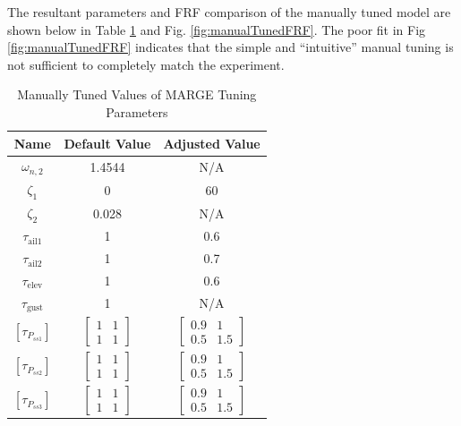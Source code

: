 The resultant parameters and FRF comparison of the manually tuned model are shown below in Table \ref{tab:manualTuning} and Fig. \ref{fig:manualTunedFRF}. The poor fit in Fig \ref{fig:manualTunedFRF} indicates that the simple and ``intuitive'' manual tuning is not sufficient to completely match the experiment.
\begin{table}[h]
	\centering
	\label{tab:manualTuning}
	\caption{Manually Tuned Values of MARGE Tuning Parameters}
	\begin{tabular}{ccc}
		\hline\hline
		Name & Default Value & Adjusted Value \\
		\hline
		$\omega_{n,2}$ & 1.4544 & N/A \\
		$\zeta_1$ & 0 & 60 \\
		$\zeta_2$ & 0.028 & N/A \\
		$\tau_\text{ail1}$ & 1 & 0.6 \\
		$\tau_\text{ail2}$ & 1 & 0.7 \\
		$\tau_\text{elev}$ & 1 & 0.6 \\
		$\tau_\text{gust}$ & 1 & N/A \\
		$\left[\tau_{P_{ss1}}\right]$ & $\begin{bmatrix} 1 & 1 \\ 1 & 1 \end{bmatrix}$ & $\begin{bmatrix} 0.9 & 1 \\ 0.5 & 1.5 \end{bmatrix}$ \\
		$\left[\tau_{P_{ss2}}\right]$ & $\begin{bmatrix} 1 & 1 \\ 1 & 1 \end{bmatrix}$ & $\begin{bmatrix} 0.9 & 1 \\ 0.5 & 1.5 \end{bmatrix}$ \\
		$\left[\tau_{P_{ss3}}\right]$ & $\begin{bmatrix} 1 & 1 \\ 1 & 1 \end{bmatrix}$ & $\begin{bmatrix} 0.9 & 1 \\ 0.5 & 1.5 \end{bmatrix}$ \\
		\hline\hline
	\end{tabular}
\end{table}

